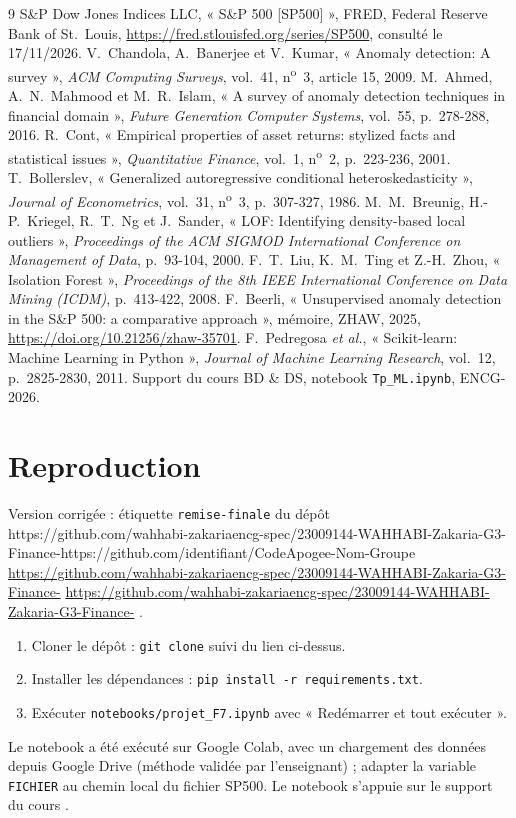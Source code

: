 \documentclass[11pt,a4paper]{article}
\newcounter{nbacompleter}
\newcommand{\lienDepot}{https://github.com/wahhabi-zakariaencg-spec/23009144-WAHHABI-Zakaria-G3-Finance-}
\newcommand{\lienParDefaut}{https://github.com/identifiant/CodeApogee-Nom-Groupe}
\newcommand{\afficherlien}{%
  \ifx\lienDepot\lienParDefaut
    \stepcounter{nbacompleter}\textcolor{red}{\expandafter\url\expandafter{\lienDepot}}%
  \else
    \expandafter\url\expandafter{\lienDepot}%
  \fi}
\begin{document}
\begin{thebibliography}{9}
   S\&P Dow Jones Indices LLC, « S\&P 500 [SP500] », FRED, Federal Reserve Bank of St.~Louis, \url{https://fred.stlouisfed.org/series/SP500}, consulté le 
  17/11/2026.
   V.~Chandola, A.~Banerjee et V.~Kumar, « Anomaly detection: A survey », \textit{ACM Computing Surveys}, vol.~41, n\textsuperscript{o}~3, article 15, 2009.
   M.~Ahmed, A.~N.~Mahmood et M.~R.~Islam, « A survey of anomaly detection techniques in financial domain », \textit{Future Generation Computer Systems}, vol.~55, p.~278-288, 2016.
   R.~Cont, « Empirical properties of asset returns: stylized facts and statistical issues », \textit{Quantitative Finance}, vol.~1, n\textsuperscript{o}~2, p.~223-236, 2001.
   T.~Bollerslev, « Generalized autoregressive conditional heteroskedasticity », \textit{Journal of Econometrics}, vol.~31, n\textsuperscript{o}~3, p.~307-327, 1986.
   M.~M.~Breunig, H.-P.~Kriegel, R.~T.~Ng et J.~Sander, « LOF: Identifying density-based local outliers », \textit{Proceedings of the ACM SIGMOD International Conference on Management of Data}, p.~93-104, 2000.
   F.~T.~Liu, K.~M.~Ting et Z.-H.~Zhou, « Isolation Forest », \textit{Proceedings of the 8th IEEE International Conference on Data Mining (ICDM)}, p.~413-422, 2008.
   F.~Beerli, « Unsupervised anomaly detection in the S\&P 500: a comparative approach », mémoire, ZHAW, 2025, \url{https://doi.org/10.21256/zhaw-35701}.
   F.~Pedregosa \textit{et al.}, « Scikit-learn: Machine Learning in Python », \textit{Journal of Machine Learning Research}, vol.~12, p.~2825-2830, 2011.
   Support du cours BD \& DS, notebook \texttt{Tp\_ML.ipynb}, ENCG-2026.
\end{thebibliography}

\appendix

\section{Reproduction}
\label{ann:reproduction}
Version corrigée : étiquette \texttt{remise-finale} du dépôt \afficherlien.
\begin{enumerate}
  \item Cloner le dépôt : \texttt{git clone} suivi du lien ci-dessus.
  \item Installer les dépendances : \texttt{pip install -r requirements.txt}.
  \item Exécuter \texttt{notebooks/projet\_F7.ipynb} avec « Redémarrer et tout exécuter ».
\end{enumerate}
Le notebook a été exécuté sur Google Colab, avec un chargement des données depuis Google Drive (méthode validée par l'enseignant) ; adapter la variable \texttt{FICHIER} au chemin local du fichier SP500. Le notebook s'appuie sur le support du cours \cite{support}.
\end{document}
